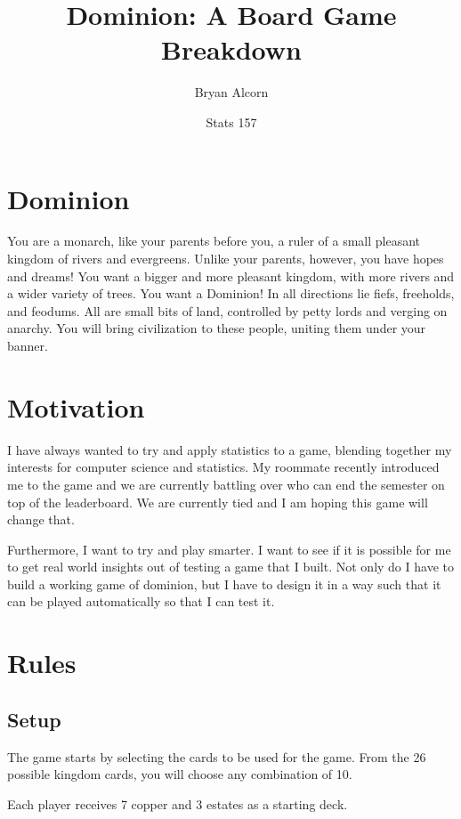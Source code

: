 \documentclass[11pt, oneside]{article}   	%
\title{Dominion: A Board Game Breakdown}
\author{Bryan Alcorn}
\date{Stats 157}							%
\begin{document}
\maketitle

\section{Dominion}

You are a monarch, like your parents before you, a ruler of a small pleasant kingdom of rivers and evergreens.
Unlike your parents, however, you have hopes and dreams!
You want a bigger and more pleasant kingdom, with more rivers and a wider variety of trees.
You want a Dominion! In all directions lie fiefs, freeholds, and feodums.
All are small bits of land, controlled by petty lords and verging on anarchy.
You will bring civilization to these people, uniting them under your banner.

\section{Motivation}

I have always wanted to try and apply statistics to a game, blending together my interests for computer science and statistics. My roommate recently introduced me to the game and we are currently battling over who can end the semester on top of the leaderboard. We are currently tied and I am hoping this game will change that. 

Furthermore, I want to try and play smarter. I want to see if it is possible for me to get real world insights out of testing a game that I built. Not only do I have to build a working game of dominion, but I have to design it in a way such that it can be played automatically so that I can test it. 

\section{Rules}

\subsection{Setup}

The game starts by selecting the cards to be used for the game. From the 26 possible kingdom cards, you will choose any combination of 10. 

Each player receives 7 copper and 3 estates as a starting deck.
\end{document}
